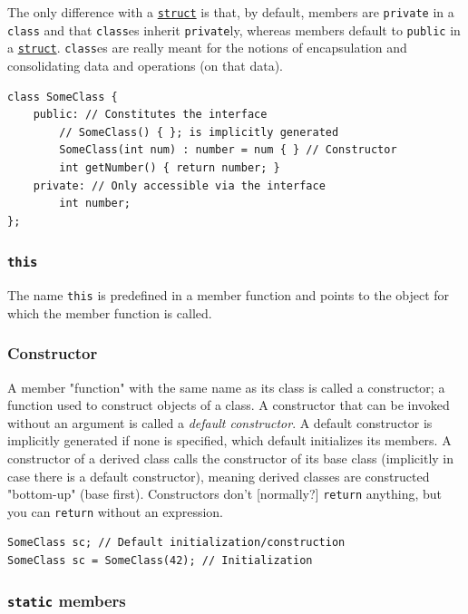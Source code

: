 \documentclass[table, xcdraw]{article}%
\begin{document}
The only difference with a \hyperref[struct]{\texttt{struct}} is that, by default, members are \texttt{private} in a \texttt{class} and that \texttt{class}es inherit \texttt{private}ly, whereas members default to \texttt{public} in a \hyperref[struct]{\texttt{struct}}. \texttt{class}es are really meant for the notions of encapsulation and consolidating data and operations (on that data).

\begin{verbatim}
class SomeClass {
    public: // Constitutes the interface
        // SomeClass() { }; is implicitly generated
        SomeClass(int num) : number = num { } // Constructor
        int getNumber() { return number; }
    private: // Only accessible via the interface
        int number;
};
\end{verbatim}

\subsubsection{\texttt{this}}

The name \texttt{this} is predefined in a member function and points to the object for which the member function is called.

\subsubsection{Constructor}
A member "function" with the same name as its class is called a constructor; a function used to construct objects of a class. A constructor that can be invoked without an argument is called a \textit{default constructor}. A default constructor is implicitly generated if none is specified, which default initializes its members. A constructor of a derived class calls the constructor of its base class (implicitly in case there is a default constructor), meaning derived classes are constructed "bottom-up" (base first). Constructors don't [normally?] \texttt{return} anything, but you can \texttt{return} without an expression.

\begin{verbatim}
SomeClass sc; // Default initialization/construction
SomeClass sc = SomeClass(42); // Initialization
\end{verbatim}

\subsubsection{\texttt{static} members} \label{staticmembers}
\end{document}
